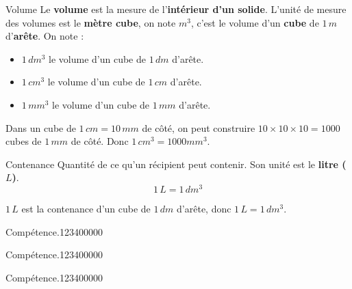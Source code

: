 \begin{pageCours}
\begin{DefT}{Volume}
Le \textbf{volume} est la mesure de l'\textbf{intérieur d'un solide}. L'unité de mesure des volumes est le \textbf{mètre cube}, on note $m^3$, c'est le volume d'un \textbf{cube} de $1\,m$ d'\textbf{arête}. On note :
\begin{itemize}
\item $1\,dm^3$ le volume d'un cube de $1\,dm$ d'arête.
\item $1\,cm^3$ le volume d'un cube de $1\,cm$ d'arête.
\item $1\,mm^3$ le volume d'un cube de $1\,mm$ d'arête.
\end{itemize}
\end{DefT}

\begin{Pp}
Dans un cube de $1\,cm=10\,mm$ de côté, on peut construire $10\times10\times10=1000$ cubes de $1\, mm$ de côté.
Donc $1 \,cm^3 = 1000 mm^3$.
\end{Pp}

\begin{DefT}{Contenance}
Quantité de ce qu'un récipient peut contenir. Son unité est le \textbf{litre ($L$)}.
\[1\,L=1\,dm^3\]
\end{DefT}

\begin{Pp}
$1\,L$ est la contenance d'un cube de $1\,dm$ d'arête,  donc $1\,L=1\,dm^3$.
\end{Pp}

\end{pageCours} %


\begin{pageAD}  %
\restoregeometry %


\begin{ExoCad}{Compétence.}{1234}{0}{0}{0}{0}{0}

\end{ExoCad}


\begin{ExoCad}{Compétence.}{1234}{0}{0}{0}{0}{0}

\end{ExoCad}


\begin{ExoCad}{Compétence.}{1234}{0}{0}{0}{0}{0}

\end{ExoCad}
 
\end{pageAD} %

